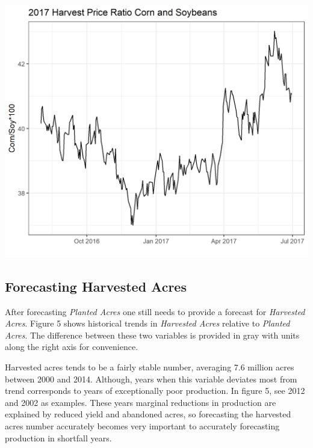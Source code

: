 \documentclass[
]{book}
\begin{document}
\includegraphics{assets/ForecastingProduction-PriceRatio.png}

\hypertarget{forecasting-harvested-acres}{%
\subsection{Forecasting Harvested Acres}\label{forecasting-harvested-acres}}

After forecasting \emph{Planted Acres} one still needs to provide a forecast for \emph{Harvested Acres}. Figure 5 shows historical trends in \emph{Harvested Acres} relative to \emph{Planted Acres}. The difference between these two variables is provided in gray with units along the right axis for convenience.

Harvested acres tends to be a fairly stable number, averaging 7.6 million acres between 2000 and 2014. Although, years when this variable deviates most from trend corresponds to years of exceptionally poor production. In figure 5, see 2012 and 2002 as examples. These years marginal reductions in production are explained by reduced yield and abandoned acres, so forecasting the harvested acres number accurately becomes very important to accurately forecasting production in shortfall years.
\end{document}

